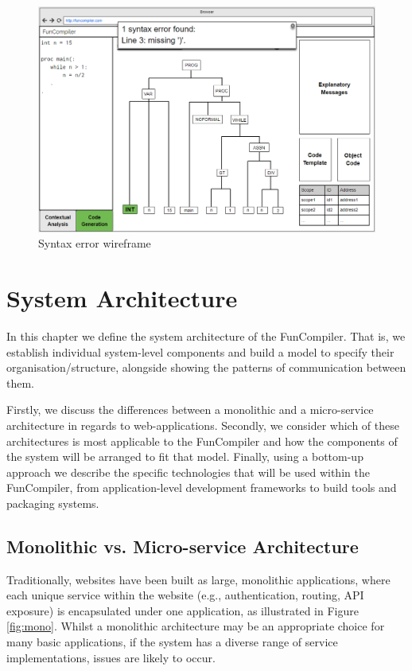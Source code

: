 \documentclass{l4proj}
\begin{document}
 \begin{figure}[h]
\centering
\includegraphics[scale=0.4]{images/syntax-error-wireframe.png}
\caption{Syntax error wireframe}
\label{fig:syntax-error-wireframe}	
\end{figure}

\chapter{System Architecture}
In this chapter we define the system architecture of the FunCompiler. That is, we establish individual system-level components and build a model to specify their organisation/structure, alongside showing the patterns of communication between them.

Firstly, we discuss the differences between a monolithic and a micro-service architecture in regards to web-applications. Secondly, we consider which of these architectures is most applicable to the FunCompiler and how the components of the system will be arranged to fit that model. Finally, using a bottom-up approach we describe the specific technologies that will be used within the FunCompiler, from application-level development frameworks to build tools and packaging systems.

\section{Monolithic vs. Micro-service Architecture}
Traditionally, websites have been built as large, monolithic applications, where each unique service within the website (e.g., authentication, routing, API exposure) is encapsulated under one application, as illustrated in Figure \ref{fig:mono}. Whilst a monolithic architecture may be an appropriate choice for many basic applications, if the system has a diverse range of service implementations, issues are likely to occur.
\end{document}
